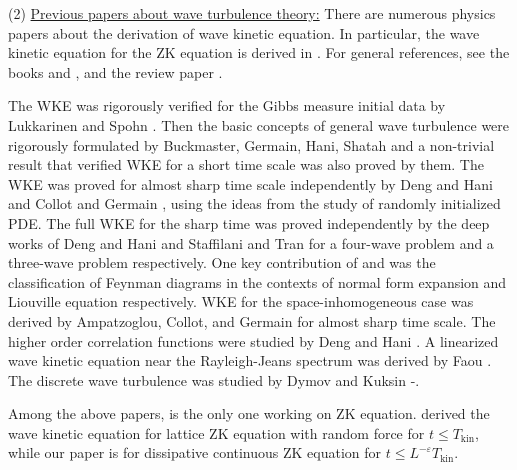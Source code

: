 (2) \underline{Previous papers about wave turbulence theory:} There are numerous physics papers about the derivation of wave kinetic equation. In particular, the wave kinetic equation for the ZK equation is derived in \cite{K}. For general references, see the books \cite{ZLFBook} and \cite{Nazarenko}, and the review paper \cite{NR}. 


The WKE was rigorously verified for the Gibbs measure initial data by Lukkarinen and Spohn \cite{LukSpohn}. Then the basic concepts of general wave turbulence were rigorously formulated by Buckmaster, Germain, Hani, Shatah \cite{BGHS2} and a non-trivial result that verified WKE for a short time scale was also proved by them. The WKE was proved for almost sharp time scale independently by Deng and Hani \cite{DH} and Collot and Germain \cite{CG1}, \cite{CG2} using the ideas from the study of randomly initialized PDE. The full WKE for the sharp time was proved independently by the deep works of Deng and Hani \cite{DH2} and Staffilani and Tran \cite{ST} for a four-wave problem and a three-wave problem respectively. One key contribution of \cite{DH2} and \cite{ST} was the classification of Feynman diagrams in the contexts of normal form expansion and Liouville equation respectively. WKE for the space-inhomogeneous case was derived by Ampatzoglou, Collot, and Germain \cite{ACG} for almost sharp time scale. The higher order correlation functions were studied by Deng and Hani \cite{DH3}. A linearized wave kinetic equation near the Rayleigh-Jeans spectrum was derived by Faou \cite{Faou}. The discrete wave turbulence was studied by Dymov and Kuksin \cite{DK1}-\cite{DK4}.
 

Among the above papers, \cite{ST} is the only one working on ZK equation. \cite{ST} derived the wave kinetic equation for lattice ZK equation with random force for $t\le T_{\text{kin}}$, while our paper is for dissipative continuous ZK equation for $t\le L^{-\varepsilon}T_{\text{kin}}$.



